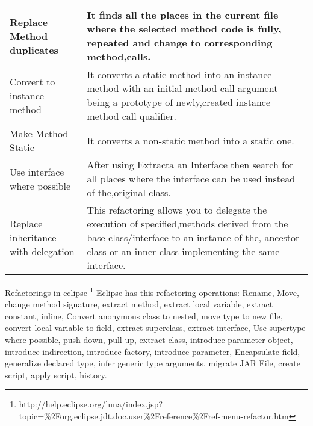 \begin{table}[h]
\begin{tabular}{p{3cm} p{11 cm}}
Replace Method duplicates           & It finds all the places in the current file where the selected method code is fully, repeated and change to corresponding method,calls.                                                                   \\ \hline
Convert to instance method          & It converts a static method into an instance method with an initial method call argument being a prototype of newly,created instance method call qualifier.                                               \\ \hline
Make Method Static                  & It converts a non-static method into a static one.                                                                                                                                                        \\ \hline
Use interface where possible        & After using Extracta an Interface then search for all places where the interface can be used instead of the,original class.                                                                               \\ \hline
Replace inheritance with delegation & This refactoring allows you to delegate the execution of specified,methods derived from the base class/interface to an instance of the, ancestor class or an inner class implementing the same interface. \\ \hline
\end{tabular}
\end{table}

Refactorings in eclipse \footnote{http://help.eclipse.org/luna/index.jsp?topic=\%2Forg.eclipse.jdt.doc.user\%2Freference\%2Fref-menu-refactor.htm}
Eclipse has this refactoring operations: Rename, Move, change method signature, extract method, extract local variable, extract constant, inline, Convert anonymous class to nested, move type to new file, convert local variable to field, extract superclass, extract interface, Use supertype where possible, push down, pull up, extract class, introduce parameter object, introduce indirection, introduce factory, introduce parameter, Encapsulate field, generalize declared type, infer generic type arguments, migrate JAR File, create script, apply script, history.


